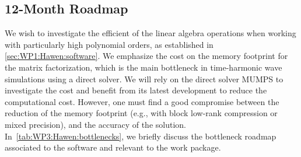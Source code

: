 \subsection{12-Month Roadmap}
\label{sec:WP3:Hawen:roadmap}
%

We wish to investigate the efficient of the linear algebra operations 
when working with particularly high polynomial orders, as established
in \cref{sec:WP1:Hawen:software}. 
We emphasize the cost on the memory footprint for the matrix factorization,
which is the main bottleneck in time-harmonic wave simulations using a 
direct solver.
We  will rely on the direct solver MUMPS to investigate the cost and benefit
from its latest development to reduce the computational cost. However, one 
must find a good compromise between the reduction of the memory footprint 
(e.g., with block low-rank compression or mixed precision), and the accuracy
of the solution.
In~\cref{tab:WP3:Hawen:bottlenecks}, we briefly discuss the bottleneck roadmap associated to the software and relevant to the work package.

